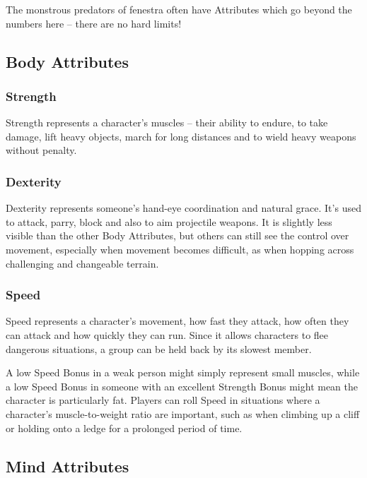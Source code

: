 \begin{multicols}{2}
The monstrous predators of \gls{fenestra} often have Attributes which go beyond the numbers here -- there are no hard limits!

\subsection{Body Attributes}


\subsubsection[Strength]{Strength }

Strength represents a character's muscles -- their ability to endure, to take damage, lift heavy objects, march for long distances and to wield heavy weapons without penalty.

\subsubsection[Dexterity]{Dexterity }

Dexterity represents someone's hand-eye coordination and natural grace.
It's used to attack, parry, block and also to aim projectile weapons.
It is slightly less visible than the other Body Attributes, but others can still see the control over movement, especially when movement becomes difficult, as when hopping across challenging and changeable terrain.

\subsubsection[Speed]{Speed }

Speed represents a character's movement, how fast they attack, how often they can attack and how quickly they can run.
Since it allows characters to flee dangerous situations, a group can be held back by its slowest member.

A low Speed Bonus in a weak person might simply represent small muscles, while a low Speed Bonus in someone with an excellent Strength Bonus might mean the character is particularly fat.
Players can roll Speed in situations where a character's muscle-to-weight ratio are important, such as when climbing up a cliff or holding onto a ledge for a prolonged period of time.

\subsection{Mind Attributes}


\end{multicols}
